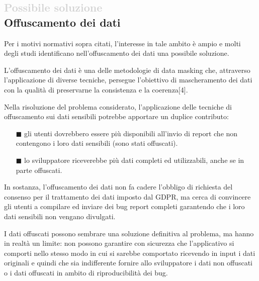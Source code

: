 
 

\subsection*{\textcolor{lightgray}{\normalsize{Possibile soluzione}} \\ Offuscamento dei dati}
Per i motivi normativi sopra citati, l'interesse in tale ambito è ampio e molti degli studi identificano nell'offuscamento dei dati una possibile soluzione. 

L'offuscamento dei dati è una delle metodologie di data masking che, attraverso l'applicazione di diverse tecniche, persegue l'obiettivo di mascheramento dei dati con la qualità di preservarne la consistenza e la coerenza[4]. 

Nella risoluzione del problema considerato, l'applicazione delle tecniche di offuscamento sui dati sensibili potrebbe apportare un duplice contributo: 
\begin{enumerate} [nosep]
  \item[$\blacksquare$] gli utenti dovrebbero essere più disponibili all'invio di report che non contengono i loro dati sensibili (sono stati offuscati).
   \item[$\blacksquare$]  lo sviluppatore riceverebbe più dati completi ed utilizzabili, anche se in parte offuscati.
\end{enumerate}In sostanza, l'offuscamento dei dati non fa cadere l'obbligo di richiesta del consenso per il trattamento dei dati imposto dal GDPR, ma cerca di convincere gli utenti a compilare ed inviare dei bug report completi garantendo che i loro dati sensibili non vengano divulgati.

I dati offuscati possono sembrare una soluzione definitiva al problema, ma hanno in realtà un limite: non possono garantire con sicurezza che l'applicativo si comporti nello stesso modo in cui si sarebbe comportato ricevendo in input i dati originali e quindi che sia indifferente fornire allo sviluppatore i dati non offuscati o i dati offuscati in ambito di riproducibilità dei bug. 



